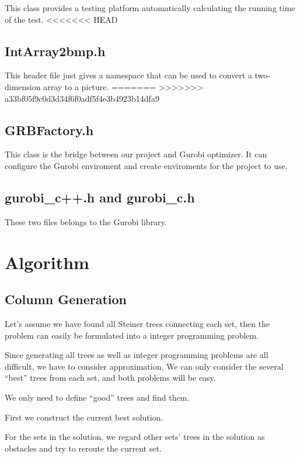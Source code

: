 \documentclass[12pt, a4paper]{article}
\begin{document}
			This class provides a testing platform automatically calculating the running time of the test.
<<<<<<< HEAD

		\subsection{IntArray2bmp.h}

			This header file just gives a namespace that can be used to convert a two-dimension array to a picture.
=======
>>>>>>> a33bf05f9c0d3d34f6f0adf5f4e3b4923b14dfa9
		
		\subsection{GRBFactory.h}
		
			This class is the bridge between our project and Gurobi optimizer. It can configure the Gurobi enviroment and create enviroments for the project to use.
		
		\subsection{gurobi\_c++.h and gurobi\_c.h}
		
			These two files belongs to the Gurobi library.

	\section{Algorithm}
	
	\subsection{Column Generation}
	
	Let's assume we have found all Steiner trees connecting each set, then the problem can easily be formulated into a integer programming problem.
	
	Since generating all trees as well as integer programming problems are all difficult, we have to consider approximation. We can only consider the several ``best'' trees from each set, and both problems will be easy.
	
	We only need to define ``good'' trees and find them.
	
	First we construct the current best solution.
	
	For the sets in the solution, we regard other sets' trees in the solution as obstacles and try to reroute the current set.
	
\end{document}
